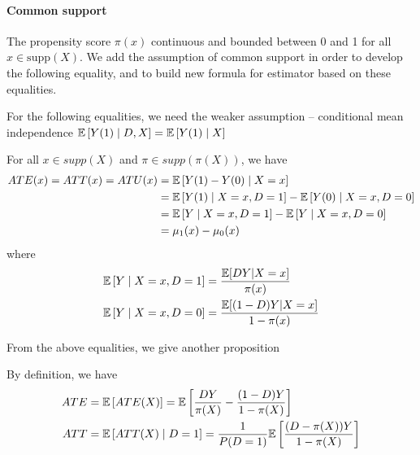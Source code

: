 \paragraph{Common support} The propensity score $\pi(x)$ continuous and bounded between 0 and 1 for all
$x\in \text{supp}(X)$. We add the assumption of common support in order to
develop the following equality, and to build new formula for estimator based on
these equalities.

For the following equalities, we need the weaker assumption -- conditional mean
independence $\mathbb{E}\left[Y(1)\mid D,X\right]=\mathbb{E}\left[Y(1)\mid X\right]$
\begin{proposition}
    For all $x\in supp(X)$ and $\pi \in supp(\pi(X))$, we have
    \begin{equation}
        \begin{split}
            ATE(x)=ATT(x)= ATU(x) & = \mathbb{E}\left[Y(1)-Y(0) \mid X=x\right]                          \\
            & = \mathbb{E}\left[Y(1)\mid X=x, D=1\right]-\mathbb{E}\left[Y(0)\mid X=x, D=0\right] \\
            & = \mathbb{E}\left[Y\mid X=x, D=1\right]-\mathbb{E}\left[Y\mid X=x, D=0\right]       \\
            & = \mu_1(x)-\mu_0(x)
        \end{split}
    \end{equation}
    where
    \begin{align}
        \mathbb{E}\left[Y\mid X=x, D=1\right] & =\frac{\mathbb{E}[DY|X=x]}{\pi(x)}       \\
        \mathbb{E}\left[Y\mid X=x, D=0\right] & =\frac{\mathbb{E}[(1-D)Y|X=x]}{1-\pi(x)}
    \end{align}

\end{proposition}

From the above equalities, we give another proposition
\begin{proposition}
    By definition, we have
    \begin{align}
        ATE & =\mathbb{E}\left[ATE(X)\right]=\mathbb{E}\left[\frac{DY}{\pi(X)}-\frac{(1-D)Y}{1-\pi(X)}\right]            \\
        ATT & =\mathbb{E}\left[ATT(X)\mid D=1\right]=\frac{1}{P(D=1)}\mathbb{E}\left[\frac{(D-\pi(X))Y}{1-\pi(X)}\right] \\
    \end{align}
\end{proposition}

